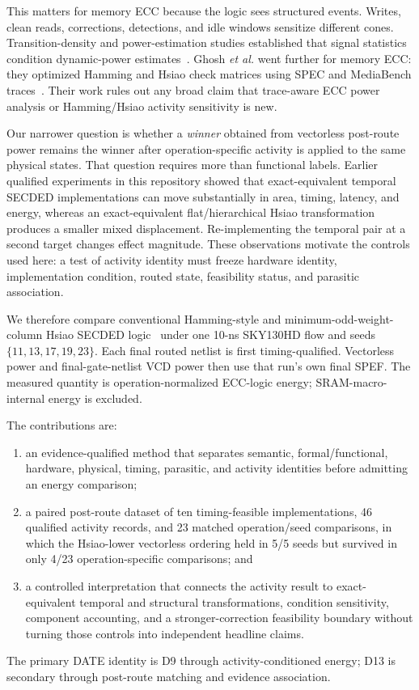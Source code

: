 \documentclass[conference,10pt]{IEEEtran}
\begin{document}
This matters for memory ECC because the logic sees structured events. Writes, clean reads, corrections, detections, and idle windows sensitize different cones. Transition-density and power-estimation studies established that signal statistics condition dynamic-power estimates~\cite{najm1993,najm1994}. Ghosh \emph{et al.} went further for memory ECC: they optimized Hamming and Hsiao check matrices using SPEC and MediaBench traces~\cite{ghosh2004}. Their work rules out any broad claim that trace-aware ECC power analysis or Hamming/Hsiao activity sensitivity is new.

Our narrower question is whether a \emph{winner} obtained from vectorless post-route power remains the winner after operation-specific activity is applied to the same physical states. That question requires more than functional labels. Earlier qualified experiments in this repository showed that exact-equivalent temporal SECDED implementations can move substantially in area, timing, latency, and energy, whereas an exact-equivalent flat/hierarchical Hsiao transformation produces a smaller mixed displacement. Re-implementing the temporal pair at a second target changes effect magnitude. These observations motivate the controls used here: a test of activity identity must freeze hardware identity, implementation condition, routed state, feasibility status, and parasitic association.

We therefore compare conventional Hamming-style and minimum-odd-weight-column Hsiao SECDED logic~\cite{hsiao1970} under one 10-ns SKY130HD flow and seeds $\{11,13,17,19,23\}$. Each final routed netlist is first timing-qualified. Vectorless power and final-gate-netlist VCD power then use that run's own final SPEF. The measured quantity is operation-normalized ECC-logic energy; SRAM-macro-internal energy is excluded.

The contributions are:
\begin{enumerate}
\item an evidence-qualified method that separates semantic, formal/functional, hardware, physical, timing, parasitic, and activity identities before admitting an energy comparison;
\item a paired post-route dataset of ten timing-feasible implementations, 46 qualified activity records, and 23 matched operation/seed comparisons, in which the Hsiao-lower vectorless ordering held in 5/5 seeds but survived in only 4/23 operation-specific comparisons; and
\item a controlled interpretation that connects the activity result to exact-equivalent temporal and structural transformations, condition sensitivity, component accounting, and a stronger-correction feasibility boundary without turning those controls into independent headline claims.
\end{enumerate}
The primary DATE identity is D9 through activity-conditioned energy; D13 is secondary through post-route matching and evidence association.
\end{document}
